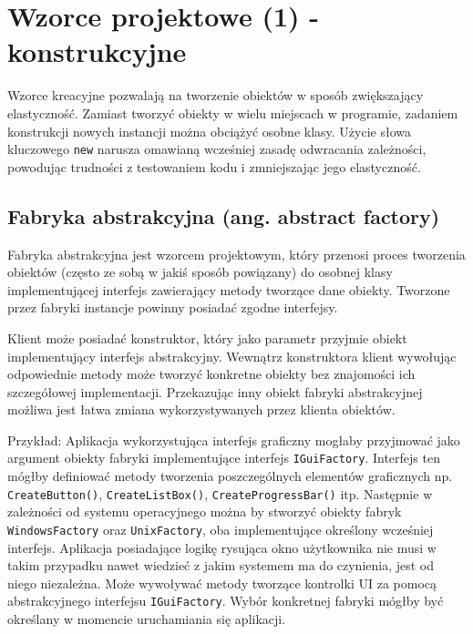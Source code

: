 \section{Wzorce projektowe (1) - konstrukcyjne}
Wzorce kreacyjne pozwalają na tworzenie obiektów w sposób zwiększający elastyczność. Zamiast tworzyć obiekty w wielu miejscach w programie, zadaniem konstrukcji nowych instancji można obciążyć osobne klasy. Użycie słowa kluczowego \texttt{new} narusza omawianą wcześniej zasadę odwracania zależności, powodując trudności z testowaniem kodu i zmniejszając jego elastyczność. 

\subsection{Fabryka abstrakcyjna (ang. abstract factory)}
Fabryka abstrakcyjna jest wzorcem projektowym, który przenosi proces tworzenia obiektów (często ze sobą w jakiś sposób powiązany) do osobnej klasy implementującej interfejs zawierający metody tworzące dane obiekty. Tworzone przez fabryki instancje powinny posiadać zgodne interfejsy.

Klient może posiadać konstruktor, który jako parametr przyjmie obiekt implementujący interfejs abstrakcyjny. Wewnątrz konstruktora klient wywołując odpowiednie metody może tworzyć konkretne obiekty bez znajomości ich szczegółowej implementacji. Przekazując inny obiekt fabryki abstrakcyjnej możliwa jest łatwa zmiana wykorzystywanych przez klienta obiektów.  

Przykład:
Aplikacja wykorzystująca interfejs graficzny mogłaby przyjmować jako argument obiekty fabryki implementujące interfejs \texttt{IGuiFactory}. Interfejs ten mógłby definiować metody tworzenia poszczególnych elementów graficznych np. \texttt{CreateButton()}, \texttt{CreateListBox()}, \texttt{CreateProgressBar()} itp. Następnie w zależności od systemu operacyjnego można by stworzyć obiekty fabryk \texttt{WindowsFactory} oraz \texttt{UnixFactory}, oba implementujące określony wcześniej interfejs. Aplikacja posiadające logikę rysująca okno użytkownika nie musi w takim przypadku nawet wiedzieć z jakim systemem ma do czynienia, jest od niego niezależna. Może wywoływać metody tworzące kontrolki UI za pomocą abstrakcyjnego interfejsu \texttt{IGuiFactory}. Wybór konkretnej fabryki mógłby być określany w momencie uruchamiania się aplikacji.



